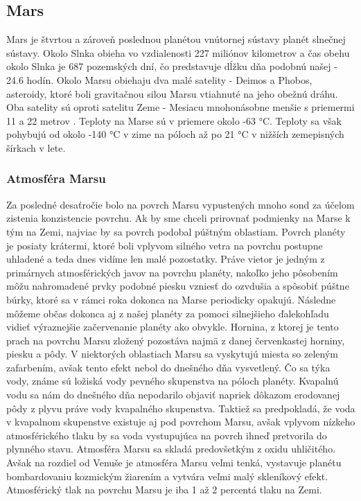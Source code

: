 \subsection{Mars}
Mars je štvrtou a zároveň poslednou planétou vnútornej sústavy planét slnečnej sústavy. Okolo Slnka obieha vo vzdialenosti 227 miliónov kilometrov a čas obehu okolo Slnka je 687 pozemských dní, čo predstavuje dĺžku dňa podobnú našej - 24.6 hodín. Okolo Marsu obiehaju dva malé satelity - Deimos a Phobos, asteroidy, ktoré boli gravitačnou silou Marsu vtiahnuté na jeho obežnú dráhu. Oba satelity sú oproti satelitu Zeme - Mesiacu mnohonásobne menšie s priemermi 11 a 22 metrov \cite{}. Teploty na Marse sú v priemere okolo -63 °C. Teploty sa však pohybujú od okolo -140 °C v zime na póloch až po 21 °C v nižších zemepisných šírkach v lete.

\subsubsection{Atmosféra Marsu}
\label{atmosferaMarsu}
Za posledné desaťročie bolo na povrch Marsu vypustených mnoho sond za účelom zistenia konzistencie povrchu. Ak by sme chceli prirovnať podmienky na Marse k tým na Zemi, najviac by sa povrch podobal púštným oblastiam. Povrch planéty je posiaty krátermi, ktoré boli vplyvom silného vetra na povrchu postupne uhladené a teda dnes vidíme len malé pozostatky. Práve vietor je jedným z primárnych atmosférických javov na povrchu planéty, nakoľko jeho pôsobením môžu nahromadené prvky podobné piesku vzniesť do ozvdušia a spôsobiť púštne búrky, ktoré sa v rámci roka dokonca na Marse periodicky opakujú. Následne môžeme občas dokonca aj z našej planéty za pomoci silnejšieho ďalekohľadu vidieť výraznejšie začervenanie planéty ako obvykle. Hornina, z ktorej je tento prach na povrchu Marsu zložený pozostáva najmä z danej červenkastej horniny, piesku a pôdy. V niektorých oblastiach Marsu sa vyskytujú miesta so zeleným zafarbením, avšak tento efekt nebol do dnešného dňa vysvetlený. Čo sa týka vody, známe sú ložiská vody pevného skupenstva na póloch planéty. Kvapalnú vodu sa nám do dnešného dňa nepodarilo objaviť napriek dôkazom erodovanej pôdy z plyvu práve vody kvapalného skupenstva. Taktiež sa predpokladá, že voda v kvapalnom skupenstve existuje aj pod povrchom Marsu, avšak vplyvom nízkeho atmosférického tlaku by sa voda vystupujúca na povrch ihneď pretvorila do plynného stavu. 
Atmosféra Marsu sa skladá predovšetkým z oxidu uhličitého. Avšak na rozdiel od Venuše je atmosféra Marsu veľmi tenká, vystavuje planétu bombardovaniu kozmickým žiarením a vytvára veľmi malý skleníkový efekt. Atmosférický tlak na povrchu Marsu je iba 1 až 2 percentá tlaku na Zemi. 
